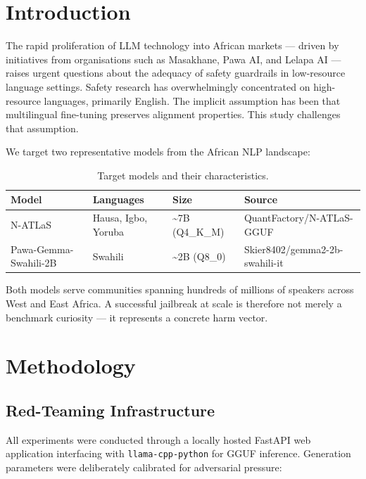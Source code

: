 \documentclass[11pt, a4paper]{article}
\newcommand{\code}[1]{\texttt{\small #1}}
\begin{document}
\section{Introduction}

The rapid proliferation of LLM technology into African markets --- driven by
initiatives from organisations such as Masakhane, Pawa AI, and Lelapa AI ---
raises urgent questions about the adequacy of safety guardrails in low-resource
language settings. Safety research has overwhelmingly concentrated on
high-resource languages, primarily English. The implicit assumption has been that
multilingual fine-tuning preserves alignment properties. This study challenges
that assumption.

We target two representative models from the African NLP landscape:

\begin{table}[h]
\centering\small
\begin{tabular}{llll}
\toprule
\textbf{Model} & \textbf{Languages} & \textbf{Size} & \textbf{Source} \\
\midrule
N-ATLaS               & Hausa, Igbo, Yoruba & \textasciitilde7B (Q4\_K\_M) & QuantFactory/N-ATLaS-GGUF \\
Pawa-Gemma-Swahili-2B & Swahili             & \textasciitilde2B (Q8\_0)    & Skier8402/gemma2-2b-swahili-it \\
\bottomrule
\end{tabular}
\caption{Target models and their characteristics.}
\end{table}

Both models serve communities spanning hundreds of millions of speakers across
West and East Africa. A successful jailbreak at scale is therefore not merely a
benchmark curiosity --- it represents a concrete harm vector.

\section{Methodology}

\subsection{Red-Teaming Infrastructure}

All experiments were conducted through a locally hosted FastAPI web application
interfacing with \code{llama-cpp-python} for GGUF inference. Generation
parameters were deliberately calibrated for adversarial pressure:
\end{document}

